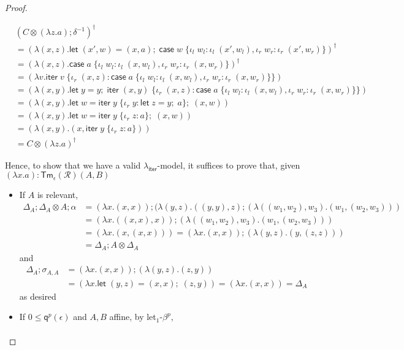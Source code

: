 \documentclass[acmsmall,screen,review]{acmart}
\newcommand{\mc}[1]{\ensuremath{\mathcal{#1}}}
\newcommand{\ms}[1]{\ensuremath{\mathsf{#1}}}
\newcommand{\lto}{:}
\newcommand{\linl}[1]{\iota_l\;{#1}}
\newcommand{\linr}[1]{\iota_r\;{#1}}
\newcommand{\letexpr}[3]{\ensuremath{\ms{let}\;#1 = #2;\;#3}}
\newcommand{\caseexpr}[5]{\ms{case}\;#1\;\{\linl{#2} \lto #3, \linr{#4} \lto #5\}}
\newcommand{\liter}[3]{\ms{iter}\;#1\;\{ \linr{#2} \lto #3 \}}
\newcommand{\brle}[1]{{\textsf{#1}}}
\newcommand{\dmor}[1]{{\Delta}_{#1}}
\newcommand{\subiterexp}{\texorpdfstring{\(\lambda_{\ms{iter}}\)}{lambda-iter}}
\newcommand{\alquant}{\ms{q}}
\begin{document}
\begin{proof}
\begin{itemize}
  \begin{align*}
    &(C \otimes (\lambda z . a) ; \delta^{-1})^\dagger \\
    &= (\lambda (x, z) . \letexpr{(x', w)}{(x, a)}
      {\caseexpr{w}{w_l}{\linl{(x', w_l)}}{w_r}{\linr{(x', w_r)}}})^\dagger
    \\
    &= (\lambda (x, z) . \caseexpr{a}{w_l}{\linl{(x, w_l)}}{w_r}{\linr{(x, w_r)}})^\dagger
    \\
    &= (\lambda v . \liter{v}{(x, z)}{\caseexpr{a}{w_l}{\linl{(x, w_l)}}{w_r}{\linr{(x, w_r)}}})
    \\
    &= (\lambda (x, y) . \letexpr{y}{y}{\liter{(x, y)}{(x, z)}{\caseexpr{a}{w_l}
      {\linl{(x, w_l)}}{w_r}{\linr{(x, w_r)}}}}) \\
    &= (\lambda (x, y) . \letexpr{w}{\liter{y}{y}{\letexpr{z}{y}{a}}}{(x, w)}) \\
    &= (\lambda (x, y) . \letexpr{w}{\liter{y}{z}{a}}{(x, w)}) \\
    &= (\lambda (x, y) . (x, \liter{y}{z}{a})) \\
    &= C \otimes (\lambda z . a)^\dagger
  \end{align*}
\end{itemize}
Hence, to show that we have a valid \subiterexp{}-model, it suffices to prove that, given $(\lambda
x.a) : \ms{Tm}_\epsilon(\mc{R})(A, B)$
\begin{itemize}
  \item If $A$ is relevant,
  \begin{align*}
  \dmor{A} ; \dmor{A} \otimes A ; \alpha
  &= (\lambda x. (x, x)) 
    ; (\lambda (y, z) . ((y, y), z) 
    ; (\lambda ((w_1, w_2), w_3) . (w_1, (w_2, w_3))) \\
  &= (\lambda x. ((x, x), x)) ; (\lambda ((w_1, w_2), w_3) . (w_1, (w_2, w_3))) \\
  &= (\lambda x. (x, (x, x))) = (\lambda x. (x, x)) ; (\lambda (y, z) . (y, (z, z))) \\
  &= \dmor{A} ; A \otimes \dmor{A}
  \end{align*}
  and
  \begin{align*}
  \dmor{A} ; \sigma_{A, A} &= (\lambda x. (x, x)) ; (\lambda (y, z) . (z, y)) \\
  &= (\lambda x. \letexpr{(y, z)}{(x, x)}{(z, y)}) = (\lambda x.(x, x)) = \dmor{A}
  \end{align*}
  as desired
  \item If $0 \leq \alquant^p(\epsilon)$ and $A, B$ affine, by \brle{let$_1$-$\beta^p$}, 
  \begin{align*}

\end{align*}
\end{itemize}
\end{proof}
\end{document}
